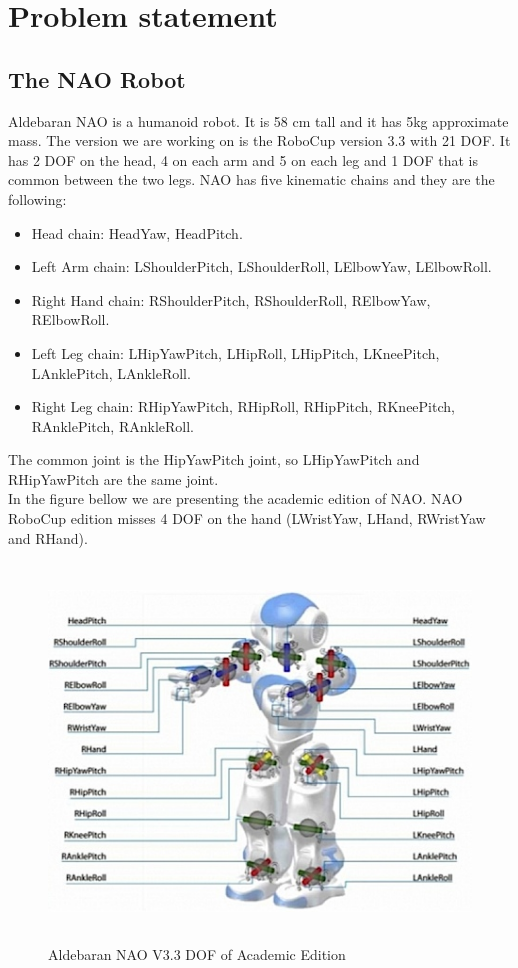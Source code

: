 
\chapter{Problem statement}
\label{problem}

\section{The NAO Robot}
Aldebaran NAO is a humanoid robot. It is 58 cm tall and it has 5kg approximate mass. The version we are working on is the RoboCup version 3.3 with 21 DOF. It has 2 DOF on the head, 4 on each arm and 5 on each leg and 1 DOF that is common between the two legs. NAO has five kinematic chains and they are the following:
\begin{itemize}
\item Head chain: HeadYaw, HeadPitch.
\item Left Arm chain: LShoulderPitch, LShoulderRoll, LElbowYaw, LElbowRoll.
\item Right Hand chain: RShoulderPitch, RShoulderRoll, RElbowYaw, RElbowRoll.
\item Left Leg chain: LHipYawPitch, LHipRoll, LHipPitch, LKneePitch, LAnklePitch, LAnkleRoll.
\item Right Leg chain: RHipYawPitch, RHipRoll, RHipPitch, RKneePitch, RAnklePitch, RAnkleRoll.
\end{itemize}
The common joint is the HipYawPitch joint, so LHipYawPitch and RHipYawPitch are the same joint.\\
In the figure bellow we are presenting the academic edition of NAO. NAO RoboCup edition misses 4 DOF on the hand (LWristYaw, LHand, RWristYaw and RHand).
\begin{figure}[h]
	\begin{center}
		\includegraphics[height = 10cm]{Figures/nao-robot-dof.jpeg}
 		\caption{Aldebaran NAO V3.3 DOF of Academic Edition}
 		\label{fig:NAO}
	\end{center}
\end{figure}
